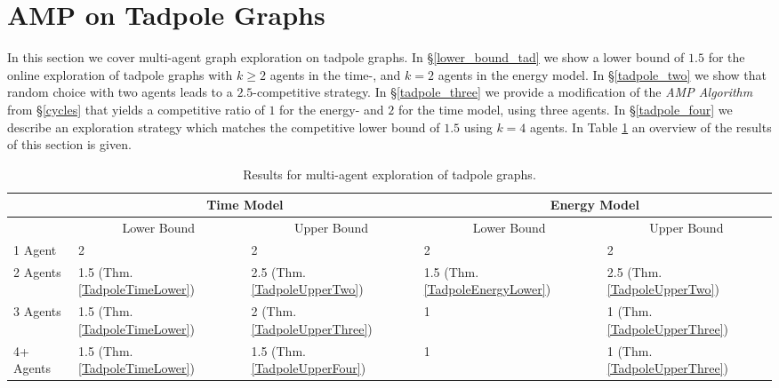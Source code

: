 \section{AMP on Tadpole Graphs} \label{tadpoles}
In this section we cover multi-agent graph exploration on tadpole graphs. In \S\ref{lower_bound_tad} we show a lower bound of $1.5$ for the online exploration of tadpole graphs with $k\geq2$ agents in the time-, and $k=2$ agents in the energy model.
In \S\ref{tadpole_two} we show that random choice with two agents leads to a $2.5$-competitive strategy. In \S\ref{tadpole_three} we provide a modification of the \textit{AMP Algorithm} from \S \ref{cycles} that yields a competitive ratio of $1$ for the energy- and $2$ for the time model, 
using three agents. In \S\ref{tadpole_four} we describe an exploration strategy which matches the competitive lower bound of $1.5$ using $k=4$ agents. In Table \ref{table:tadpole} an overview of the results of this section is given.

    \begin{table}[H]
        \small
        \centering
        \begin{tabular}{|l|ll|ll|}
        \hline
                  & \multicolumn{2}{c|}{Time Model}                                     & \multicolumn{2}{c|}{Energy Model}                                   \\ \hline
                  & \multicolumn{1}{c|}{Lower Bound} & \multicolumn{1}{c|}{Upper Bound} & \multicolumn{1}{c|}{Lower Bound} & \multicolumn{1}{c|}{Upper Bound} \\ \hline
        1 Agent   & \multicolumn{1}{l|}{2 \cite{Brandt2020}}           & 2\cite{Brandt2020}                                & \multicolumn{1}{l|}{2\cite{Brandt2020}}           & 2\cite{Brandt2020}                               \\ \hline
        2 Agents  & \multicolumn{1}{l|}{1.5 (Thm. \ref{TadpoleTimeLower})}         & 2.5 (Thm. \ref{TadpoleUpperTwo})                              & \multicolumn{1}{l|}{1.5 (Thm. \ref{TadpoleEnergyLower})}            & 2.5 (Thm. \ref{TadpoleUpperTwo})                               \\ \hline
        3 Agents  & \multicolumn{1}{l|}{1.5 (Thm. \ref{TadpoleTimeLower})}         & 2 (Thm. \ref{TadpoleUpperThree})                               & \multicolumn{1}{l|}{1}           & 1 (Thm. \ref{TadpoleUpperThree})                               \\ \hline
        4+ Agents & \multicolumn{1}{l|}{1.5 (Thm. \ref{TadpoleTimeLower})}         & 1.5 (Thm. \ref{TadpoleUpperFour})                             & \multicolumn{1}{l|}{1}           & 1 (Thm. \ref{TadpoleUpperThree})                               \\ \hline
        \end{tabular}
        \caption{Results for multi-agent exploration of tadpole graphs.} \label{table:tadpole}
    \end{table}


